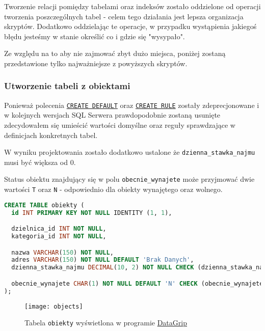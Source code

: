 Tworzenie relacji pomiędzy tabelami oraz indeksów zostało oddzielone od operacji tworzenia poszczególnych tabel - celem tego działania jest lepsza organizacja skryptów. Dodatkowo oddzielając te operacje, w przypadku wystąpienia jakiegoś błędu jesteśmy w stanie określić co i gdzie się "wysypało".

Ze względu na to aby nie zajmować zbyt dużo miejsca, poniżej zostaną przedstawione tylko najważniejsze z powyższych skryptów.

\subsubsection{Utworzenie tabeli z obiektami}

Ponieważ polecenia \href{https://docs.microsoft.com/pl-pl/sql/t-sql/statements/create-default-transact-sql?view=sql-server-2017}{\texttt{CREATE DEFAULT}} oraz \href{https://docs.microsoft.com/pl-pl/sql/t-sql/statements/create-rule-transact-sql?view=sql-server-2017}{\texttt{CREATE RULE}} zostały zdeprecjonowane i w kolejnych wersjach SQL Serwera prawdopodobnie zostaną usunięte zdecydowałem się umieścić wartości domyślne oraz reguły sprawdzające w definicjach konkretnych tabel.

W wyniku projektowania zostało dodatkowo ustalone że \texttt{dzienna\_stawka\_najmu} musi być większa od 0.

Status obiektu znajdujący się w polu \texttt{obecnie\_wynajete} może przyjmować dwie wartości \texttt{T} oraz \texttt{N} - odpowiednio dla obiekty wynajętego oraz wolnego.

\begin{lstlisting}[language=SQL, caption={Skrypt tworzący tabelę \texttt{obiekty}}, label={lst:table-objects}]
CREATE TABLE obiekty (
  id INT PRIMARY KEY NOT NULL IDENTITY (1, 1),

  dzielnica_id INT NOT NULL,
  kategoria_id INT NOT NULL,

  nazwa VARCHAR(150) NOT NULL,
  adres VARCHAR(150) NOT NULL DEFAULT 'Brak Danych',
  dzienna_stawka_najmu DECIMAL(10, 2) NOT NULL CHECK (dzienna_stawka_najmu > 0),

  obecnie_wynajete CHAR(1) NOT NULL DEFAULT 'N' CHECK (obecnie_wynajete IN ('T', 'N')),
);
\end{lstlisting}

\begin{figure}[h]
	\centering
    \texttt{[image: objects]}
	\caption{Tabela \texttt{obiekty} wyświetlona w programie \href{https://www.jetbrains.com/datagrip/}{DataGrip}}
	\label{fig:objects}
\end{figure}

